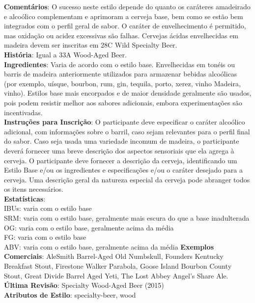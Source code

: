 \textbf{Comentários}: O sucesso neste estilo depende do quanto os caráteres amadeirado e alcoólico complementam e aprimoram a cerveja base, bem como se estão bem integrados com o perfil geral de sabor. O caráter de envelhecimento é permitido, mas oxidação ou acidez excessivas são falhas. Cervejas ácidas envelhecidas em madeira devem ser inscritas em 28C Wild Specialty Beer. \\
\textbf{História}: Igual a 33A Wood-Aged Beer. \\
\textbf{Ingredientes}: Varia de acordo com o estilo base. Envelhecidas em tonéis ou barris de madeira anteriormente utilizados para armazenar bebidas alcoólicas (por exemplo, uísque, bourbon, rum, gin, tequila, porto, xerez, vinho Madeira, vinho). Estilos base mais encorpados e de maior densidade geralmente são usados, pois podem resistir melhor aos sabores adicionais, embora experimentações são incentivadas. \\
\textbf{Instruções para Inscrição}: O participante deve especificar o caráter alcoólico adicional, com informações sobre o barril, caso sejam relevantes para o perfil final do sabor. Caso seja usada uma variedade incomum de madeira, o participante deverá fornecer uma breve descrição dos aspectos sensoriais que ela agrega à cerveja. O participante deve fornecer a descrição da cerveja, identificando um Estilo Base e/ou os ingredientes e especificações e/ou o caráter desejado para a cerveja. Uma descrição geral da natureza especial da cerveja pode abranger todos os itens necessários. \\
\textbf{Estatísticas}:\\
IBUs: varia com o estilo base\\
SRM: varia com o estilo base, geralmente mais escura do que a base inadulterada\\
OG: varia com o estilo base, geralmente acima da média\\
FG: varia com o estilo base\\
ABV: varia com o estilo base, geralmente acima da média
\textbf{Exemplos Comerciais}: AleSmith Barrel-Aged Old Numbskull, Founders Kentucky Breakfast Stout, Firestone Walker Parabola, Goose Island Bourbon County Stout, Great Divide Barrel Aged Yeti, The Lost Abbey Angel’s Share Ale. \\
\textbf{Última Revisão}: Specialty Wood-Aged Beer (2015) \\
\textbf{Atributos de Estilo}: specialty-beer, wood
